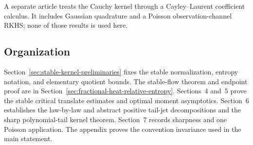 A separate article treats the Cauchy kernel through a Cayley--Laurent
coefficient calculus.  It includes Gaussian quadrature and a Poisson
observation-channel RKHS; none of those results is used here.

\newpage
\subsection*{Organization}

Section~\ref{sec:stable-kernel-preliminaries} fixes the stable normalization,
entropy notation, and elementary quotient bounds.  The stable-flow theorem
and endpoint proof are in
Section~\ref{sec:fractional-heat-relative-entropy}.  Sections~4 and~5 prove
the stable critical translate estimates and optimal moment asymptotics.
Section~6 establishes the law-by-law and abstract positive tail-jet
decompositions and the sharp polynomial-tail kernel theorem.  Section~7
records sharpness and one Poisson application.
The appendix proves the convention invariance used in the main
statement.
